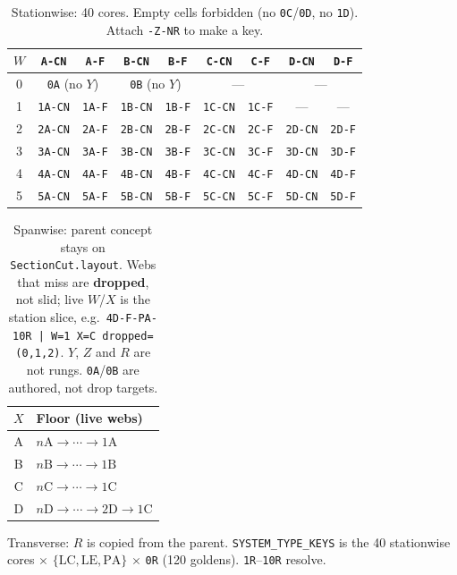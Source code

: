 \documentclass[11pt,a4paper]{article}
\newcommand{\tok}[1]{\texttt{#1}}
\newcommand{\code}[1]{\texttt{#1}}
\begin{document}
\begin{table}[H]
\centering
\caption{Stationwise: 40 cores. Empty cells forbidden (no \tok{0C}/\tok{0D},
no \tok{1D}). Attach \tok{-Z-NR} to make a key.}
\label{tab:registry}
\small
\begin{tabular}{@{}c *{8}{c}@{}}
\toprule
$W$ & \tok{A-CN} & \tok{A-F} & \tok{B-CN} & \tok{B-F}
    & \tok{C-CN} & \tok{C-F} & \tok{D-CN} & \tok{D-F} \\
\midrule
0 & \multicolumn{2}{c}{\tok{0A} (no $Y$)}
  & \multicolumn{2}{c}{\tok{0B} (no $Y$)}
  & \multicolumn{2}{c}{---}
  & \multicolumn{2}{c}{---} \\
1 & \tok{1A-CN} & \tok{1A-F} & \tok{1B-CN} & \tok{1B-F}
  & \tok{1C-CN} & \tok{1C-F} & --- & --- \\
2 & \tok{2A-CN} & \tok{2A-F} & \tok{2B-CN} & \tok{2B-F}
  & \tok{2C-CN} & \tok{2C-F} & \tok{2D-CN} & \tok{2D-F} \\
3 & \tok{3A-CN} & \tok{3A-F} & \tok{3B-CN} & \tok{3B-F}
  & \tok{3C-CN} & \tok{3C-F} & \tok{3D-CN} & \tok{3D-F} \\
4 & \tok{4A-CN} & \tok{4A-F} & \tok{4B-CN} & \tok{4B-F}
  & \tok{4C-CN} & \tok{4C-F} & \tok{4D-CN} & \tok{4D-F} \\
5 & \tok{5A-CN} & \tok{5A-F} & \tok{5B-CN} & \tok{5B-F}
  & \tok{5C-CN} & \tok{5C-F} & \tok{5D-CN} & \tok{5D-F} \\
\bottomrule
\end{tabular}
\end{table}

\begin{table}[H]
\centering
\caption{Spanwise: parent concept stays on \code{SectionCut.layout}.
Webs that miss are \textbf{dropped}, not slid; live $W$/$X$ is the station
slice, e.g.\ \tok{4D-F-PA-10R | W=1 X=C dropped=(0,1,2)}.
$Y$, $Z$ and $R$ are not rungs. \tok{0A}/\tok{0B} are authored, not drop targets.}
\label{tab:floors}
\begin{tabularx}{\textwidth}{@{}cX@{}}
\toprule
$X$ & Floor (live webs) \\
\midrule
A & $n\mathrm{A}\to\cdots\to 1\mathrm{A}$ \\
B & $n\mathrm{B}\to\cdots\to 1\mathrm{B}$ \\
C & $n\mathrm{C}\to\cdots\to 1\mathrm{C}$ \\
D & $n\mathrm{D}\to\cdots\to 2\mathrm{D}\to 1\mathrm{C}$ \\
\bottomrule
\end{tabularx}
\end{table}

\noindent
Transverse: $R$ is copied from the parent.
\code{SYSTEM\_TYPE\_KEYS} is the 40 stationwise cores $\times$
$\{\mathrm{LC},\mathrm{LE},\mathrm{PA}\}$ $\times$ \tok{0R} (120 goldens).
\tok{1R}--\tok{10R} resolve.
\end{document}
